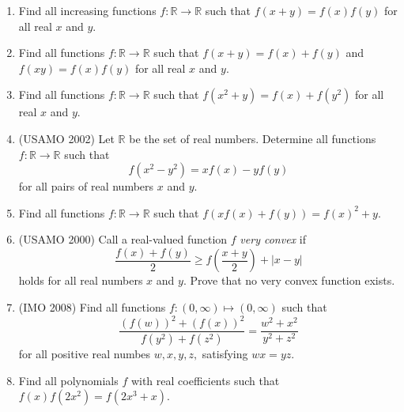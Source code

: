 \documentclass[11pt]{article}
\begin{document}
\begin{enumerate} 
  \item Find all increasing functions $f : \mathbb{R} \to \mathbb{R}$ such that $f(x+y) = f(x)f(y)$ for all real $x$ and $y$. 
  
  \item Find all functions $f : \mathbb{R} \to \mathbb{R}$ such that $f(x+y) = f(x) + f(y)$ and $f(xy) = f(x)f(y)$ for all real $x$ and $y$. 
  
  \item Find all functions $f : \mathbb{R} \to \mathbb{R}$ such that $f(x^2 + y) = f(x) + f(y^2)$ for all real $x$ and $y$. 
  
  
  \item (USAMO 2002) Let $\mathbb{R}$ be the set of real numbers. Determine all functions $f : \mathbb{R} \to \mathbb{R}$ such that
  \[ f(x^2 - y^2) = xf(x) - yf(y) \]
  for all pairs of real numbers $x$ and $y$. 
  
  
  \item Find all functions $f : \mathbb{R} \to \mathbb{R}$ such that $f(xf(x) + f(y)) = f(x)^2 + y$. 
  
  
  \item (USAMO 2000) Call a real-valued function $f$ \emph{very convex} if 
  \[ \frac{f(x) + f(y)}{2} \geq f \left( \frac{x+y}{2} \right) + |x - y| \]
  holds for all real numbers $x$ and $y$. Prove that no very convex function exists. 
    
  \item (IMO 2008) Find all functions $ f: (0, \infty) \mapsto (0, \infty)$ such that
\[ \frac {\left( f(w) \right)^2 + \left( f(x) \right)^2}{f(y^2) + f(z^2) } = \frac {w^2 + x^2}{y^2 + z^2} \]
for all positive real numbes $ w,x,y,z,$ satisfying $ wx = yz.$

  \item Find all polynomials $f$ with real coefficients such that $f(x) f(2x^2) = f(2x^3 + x)$. 
  

\end{enumerate}
\end{document}
